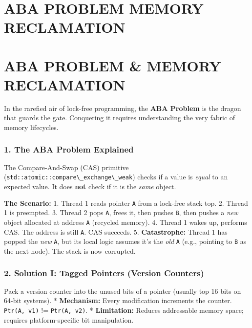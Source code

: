 \hypertarget{aba-problem-memory-reclamation}{%
\chapter{ABA PROBLEM MEMORY
RECLAMATION}\label{aba-problem-memory-reclamation}}

\hypertarget{aba-problem-memory-reclamation-1}{%
\chapter{ABA PROBLEM \& MEMORY
RECLAMATION}\label{aba-problem-memory-reclamation-1}}

In the rarefied air of lock-free programming, the \textbf{ABA Problem}
is the dragon that guards the gate. Conquering it requires understanding
the very fabric of memory lifecycles.

\hypertarget{the-aba-problem-explained}{%
\subsection{1. The ABA Problem
Explained}\label{the-aba-problem-explained}}

The Compare-And-Swap (CAS) primitive
(\passthrough{\lstinline!std::atomic::compare\_exchange\_weak!}) checks
if a value is \emph{equal} to an expected value. It does \textbf{not}
check if it is the \emph{same} object.

\textbf{The Scenario:} 1. Thread 1 reads pointer
\passthrough{\lstinline!A!} from a lock-free stack top. 2. Thread 1 is
preempted. 3. Thread 2 pops \passthrough{\lstinline!A!}, frees it, then
pushes \passthrough{\lstinline!B!}, then pushes a \emph{new} object
allocated at address \passthrough{\lstinline!A!} (recycled memory). 4.
Thread 1 wakes up, performs CAS. The address is still
\passthrough{\lstinline!A!}. CAS succeeds. 5. \textbf{Catastrophe:}
Thread 1 has popped the \emph{new} \passthrough{\lstinline!A!}, but its
local logic assumes it's the \emph{old} \passthrough{\lstinline!A!}
(e.g., pointing to \passthrough{\lstinline!B!} as the next node). The
stack is now corrupted.

\hypertarget{solution-i-tagged-pointers-version-counters}{%
\subsection{2. Solution I: Tagged Pointers (Version
Counters)}\label{solution-i-tagged-pointers-version-counters}}

Pack a version counter into the unused bits of a pointer (usually top 16
bits on 64-bit systems). * \textbf{Mechanism:} Every modification
increments the counter. \passthrough{\lstinline!Ptr(A, v1)!} !=
\passthrough{\lstinline!Ptr(A, v2)!}. * \textbf{Limitation:} Reduces
addressable memory space; requires platform-specific bit manipulation.

